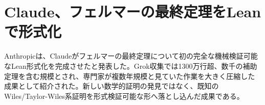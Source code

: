 \section{Claude、フェルマーの最終定理をLeanで形式化}

Anthropicは、Claudeがフェルマーの最終定理について初の完全な機械検証可能なLean形式化を完成させたと発表した。Grok収集では1300万行超、数千の補助定理を含む規模とされ、専門家が複数年規模と見ていた作業を大きく圧縮した成果として紹介された。新しい数学的証明の発見ではなく、既知のWiles/Taylor-Wiles系証明を形式検証可能な形へ落とし込んだ成果である。


